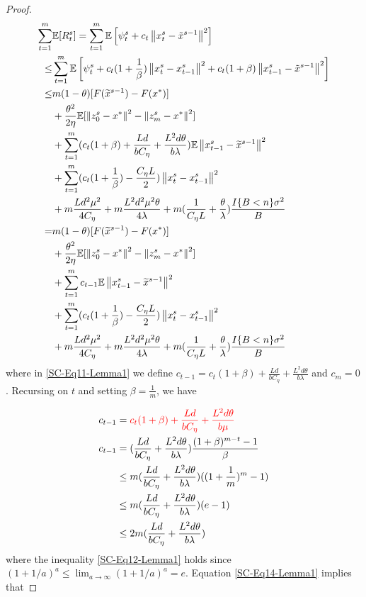 \documentclass{article}
\newcommand*{\E}{\mathbb{E}}
\newcommand{\norm}[1]{\left\lVert#1\right\rVert}
\theoremstyle{definition}
\theoremstyle{remark}
\begin{document}
{\begin{proof}
\begin{align}
\sum_{t=1}^{m}& \E[R_{t}^s] = \sum_{t=1}^{m}\E\left[\psi_{t}^s+ c_{t}\norm{x_{t}^s-\tilde{x}^{s-1}}^2\right]\notag\\
\leq& \sum_{t=1}^{m}\E\left[\psi_{t}^s+ c_{t}(1+\frac{1}{\beta})\norm{x_{t}^s-x_{t-1}^s}^2+ c_{t}(1+{\beta})\norm{x_{t-1}^s-\tilde{x}^{s-1}}^2\right]\\
\leq & m(1-\theta)[F(\widetilde{x}^{s-1})-F(x^*)]\notag \\
&+ {\frac{ \theta^2}{2\eta}}\E[\norm{z_{0}^s-x^*}^2-\norm{z_{m}^s-x^*}^2]\notag\\
&+ \sum_{t=1}^{m} (c_{t}(1+{\beta})+\frac{Ld}{bC_{\eta}}+\frac{L^2d\theta}{b\lambda})\E\norm{x_{t-1}^s-\widetilde{x}^{s-1}}^2\notag\\
&+\sum_{t=1}^{m}(c_{t}(1+\frac{1}{\beta})-\frac{C_{\eta} L}{2})\norm{x_{t}^s-x_{t-1}^s}^2\notag\\
&+m\frac{Ld^2\mu^2}{4C_{\eta}}+m\frac{ L^2d^2\mu^2\theta}{4\lambda}+m(\frac{1}{C_{\eta} L}+\frac{\theta}{\lambda})\frac{I\{B < n\} \sigma ^2}{B}\\
= & m(1-\theta)[F(\widetilde{x}^{s-1})-F(x^*)]\notag\\
&+ {\frac{ \theta^2}{2\eta}}\E[\norm{z_{0}^s-x^*}^2-\norm{z_{m}^s-x^*}^2]\notag\\
&+ \sum_{t=1}^{m} c_{t-1}\E\norm{x_{t-1}^s-\widetilde{x}^{s-1}}^2\notag\\
&+\sum_{t=1}^{m}(c_{t}(1+\frac{1}{\beta})-\frac{C_{\eta} L}{2})\norm{x_{t}^s-x_{t-1}^s}^2\notag\\
&+m\frac{Ld^2\mu^2}{4C_{\eta}}+m\frac{ L^2d^2\mu^2\theta}{4\lambda}+m(\frac{1}{C_{\eta} L}+\frac{\theta}{\lambda})\frac{I\{B < n\} \sigma ^2}{B}\label{SC-Eq11-Lemma1}
\end{align}
where in \eqref{SC-Eq11-Lemma1} we define $c_{t-1} = c_{t}(1+{\beta})+\frac{Ld}{bC_{\eta}}+\frac{L^2d\theta}{b\lambda}$ and $c_m=0$. Recursing on $t$ and setting $\beta = \frac{1}{m}$, we have 

\begin{align}
c_{t-1} &= {\color{red} c_{t}(1+{\beta})+\frac{Ld}{bC_{\eta}}+\frac{L^2d\theta}{b\mu} \notag}\\
c_{t-1} &= (\frac{Ld}{bC_{\eta}}+\frac{L^2d\theta}{b\lambda }) \frac{(1+\beta)^{m-t}-1}{\beta} \notag\\
&\leq m(\frac{Ld}{bC_{\eta}}+\frac{L^2d\theta}{b\lambda })((1+\frac{1}{m})^m-1)\label{SC-Eq12-Lemma1}\\
&\leq m(\frac{Ld}{bC_{\eta} }+\frac{L^2d\theta}{b\lambda })(e-1)\notag\\
&\leq 2m(\frac{Ld}{bC_{\eta} }+\frac{L^2d\theta}{b\lambda })\label{SC-Eq14-Lemma1}
\end{align}
where the inequality \eqref{SC-Eq12-Lemma1} holds since $(1+1/a)^a\leq \lim_{a\to\infty}(1+1/a)^a = e$.
Equation \eqref{SC-Eq14-Lemma1} implies that 


\end{proof}}
\end{document}
